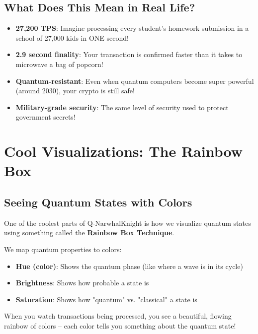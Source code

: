 \documentclass[11pt,a4paper]{article}
\begin{document}
\subsection{What Does This Mean in Real Life?}

\begin{itemize}
    \item \textbf{27,200 TPS}: Imagine processing every student's homework submission in a school of 27,000 kids in ONE second!

    \item \textbf{2.9 second finality}: Your transaction is confirmed faster than it takes to microwave a bag of popcorn!

    \item \textbf{Quantum-resistant}: Even when quantum computers become super powerful (around 2030), your crypto is still safe!

    \item \textbf{Military-grade security}: The same level of security used to protect government secrets!
\end{itemize}

\section{Cool Visualizations: The Rainbow Box}

\subsection{Seeing Quantum States with Colors}

One of the coolest parts of Q-NarwhalKnight is how we visualize quantum states using something called the \textbf{Rainbow Box Technique}.

\begin{tcolorbox}[colback=brightgreen!10,colframe=brightgreen,title=\textbf{How It Works}]
We map quantum properties to colors:
\begin{itemize}
    \item \textbf{Hue (color)}: Shows the quantum phase (like where a wave is in its cycle)
    \item \textbf{Brightness}: Shows how probable a state is
    \item \textbf{Saturation}: Shows how "quantum" vs. "classical" a state is
\end{itemize}

When you watch transactions being processed, you see a beautiful, flowing rainbow of colors -- each color tells you something about the quantum state!
\end{tcolorbox}
\end{document}
